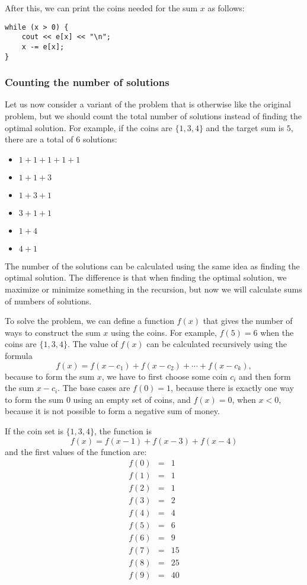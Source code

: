 After this, we can print the coins needed
for the sum $x$ as follows:

\begin{lstlisting}
while (x > 0) {
    cout << e[x] << "\n";
    x -= e[x];
}
\end{lstlisting}

\subsubsection{Counting the number of solutions}

Let us now consider a variant of the problem
that is otherwise like the original problem,
but we should count the total number of solutions instead
of finding the optimal solution.
For example, if the coins are $\{1,3,4\}$ and
the target sum is $5$,
there are a total of 6 solutions:

\begin{multicols}{2}
\begin{itemize}
\item $1+1+1+1+1$
\item $1+1+3$
\item $1+3+1$
\item $3+1+1$
\item $1+4$
\item $4+1$
\end{itemize}
\end{multicols}

The number of the solutions can be calculated
using the same idea as finding the optimal solution.
The difference is that when finding the optimal solution,
we maximize or minimize something in the recursion,
but now we will calculate sums of numbers of solutions.

To solve the problem, we can define a function $f(x)$
that gives the number of ways to construct
the sum $x$ using the coins.
For example, $f(5)=6$ when the coins are $\{1,3,4\}$.
The value of $f(x)$ can be calculated recursively
using the formula
\[ f(x) = f(x-c_1)+f(x-c_2)+\cdots+f(x-c_k),\]
because to form the sum $x$, we have to first
choose some coin $c_i$ and then form the sum $x-c_i$.
The base cases are $f(0)=1$, because there is exactly
one way to form the sum 0 using an empty set of coins,
and $f(x)=0$, when $x<0$, because it is not possible
to form a negative sum of money.

If the coin set is $\{1,3,4\}$, the function is
\[ f(x) = f(x-1)+f(x-3)+f(x-4) \]
and the first values of the function are:
\[
\begin{array}{lcl}
f(0) & = & 1 \\
f(1) & = & 1 \\
f(2) & = & 1 \\
f(3) & = & 2 \\
f(4) & = & 4 \\
f(5) & = & 6 \\
f(6) & = & 9 \\
f(7) & = & 15 \\
f(8) & = & 25 \\
f(9) & = & 40 \\
\end{array}
\]

